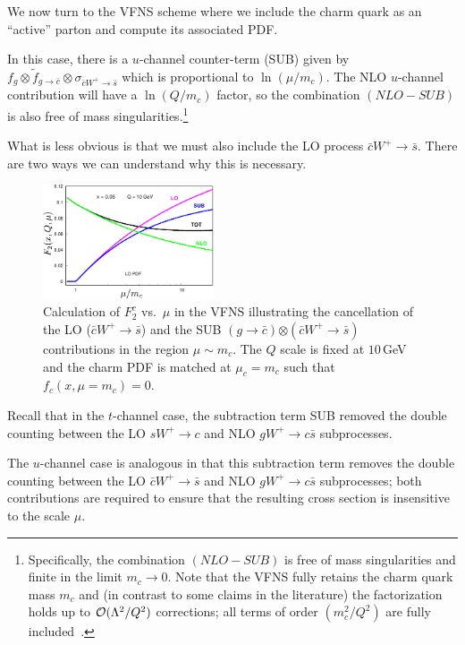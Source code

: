 %
We now turn to the VFNS scheme where we include the charm quark as an
``active'' parton and compute its associated PDF.

In this case, there is a $u$-channel counter-term (SUB) given by
$f_{g}\otimes\widetilde{f}_{g\to\bar{c}}\otimes\sigma_{\bar{c}W^{+}\to\bar{s}}$
which is proportional to $\ln(\mu/m_{c})$. The NLO $u$-channel
contribution will have a $\ln(Q/m_{c})$ factor, so the combination
$(NLO-SUB)$ is also free of mass singularities.\footnote{Specifically,
  the combination $(NLO-SUB)$ is free of mass singularities and finite
  in the limit $m_{c}\to0$. Note that the VFNS fully retains the charm
  quark mass $m_{c}$ and (in contrast to some claims in the
  literature) the factorization holds up to
  ${\cal O}(\Lambda^{2}/Q^{2})$ corrections; all terms of order
  $(m_{c}^{2}/Q^{2})$ are fully included~\cite{Collins:1998rz}.}

What is less obvious is that we must also include the LO process
\mbox{$\bar{c}W^{+}\to\bar{s}$}. There are two ways we can understand
why this is necessary.



\begin{figure}
\centering \includegraphics[clip,width=0.45\textwidth]{pics/fred/acot_fig}
\caption{Calculation of $F_{2}^{c}$ vs.\ $\mu$ in the VFNS
  illustrating the cancellation of the LO ($\bar{c}W^{+}\to\bar{s}$)
  and the SUB \hbox{$(g\to
    \bar{c})$}$\otimes$\hbox{$(\bar{c}W^+
    \to \bar{s})$}
  contributions in the region $\mu\sim m_{c}$. The $Q$ scale is fixed
  at $10\,$GeV and the charm PDF is matched at $\mu_{c}=m_{c}$ such
  that $f_{c}(x,\mu=m_{c})=0$. \label{fig:acot}}
\end{figure}


%
Recall that in the $t$-channel case, the subtraction term SUB removed
the double counting between the LO \mbox{$sW^{+}\to c$} and NLO
\mbox{$gW^{+}\to c\bar{s}$} subprocesses.

The $u$-channel case is analogous in that this subtraction term
removes the double counting between the LO
\mbox{$\bar{c}W^{+}\to\bar{s}$} and NLO \mbox{$gW^{+}\to c\bar{s}$}
subprocesses; both contributions are required to ensure that the resulting
cross section is insensitive to the scale $\mu$.

